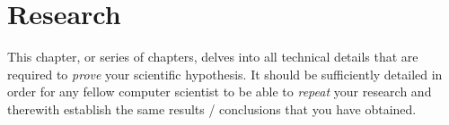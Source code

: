 \chapter{Research}\label{research}
This chapter, or series of chapters, delves into all technical details that are
required to \emph{prove} your scientific hypothesis.
It should be sufficiently detailed in order for any fellow computer scientist to be able to \emph{repeat}
your research and therewith establish the same results / conclusions that you have obtained.

